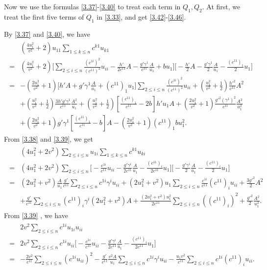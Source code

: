 \documentclass[11pt]{amsart}
\numberwithin{equation}{section}
\begin{document}
Now we use the formulas \eqref{3.37}-\eqref{3.40}  to treat  each term in $Q_1, Q_2$.  At first, we treat  the first five terms of $Q_1$ in \eqref{3.33}, and get \eqref{3.42}-\eqref{3.46}.

By \eqref{3.37} and  \eqref{3.40}, we have
\begin{align}\label{3.42}
\begin{split}
&(\frac{4 u_1^2}{v^2}+2)u_{11}\sum_{1\leq k\leq n}c^{k1}u_{k1}\\
=&(\frac{4 u_1^2}{v^2}+2)\big[\sum_{2\leq i\leq n}\frac{(c^{1i})^2}{(c^{11})^2}u_{ii}-\frac{h'}{2c^{11}} A-\frac{g'\gamma^1}{c^{11}}\frac{A}{u_1}+bu_1\big]
\big[-\frac{h'}{2} A-\frac{g'\gamma^1}{2}\frac{A}{u_1}-\frac{(c^{11})_1}{2} u_1\big]\\
=&-(\frac{2u_1^2}{v^2}+1)\big[h' A+g'\gamma^1\frac{A}{u_1}+(c^{11})_1 u_1\big]\sum_{2\leq i\leq n}\frac{(c^{1i})^2}{(c^{11})^2}u_{ii}
+(\frac{ u_1^2}{v^2}+\frac{1}{2})\frac{h'^2}{c^{11}} A^2\\&+(\frac{ u_1^2}{v^2}+\frac{1}{2})\frac{3h'g'\gamma^1}{c^{11}}\frac{A^2}{u_1}
+(\frac{ u_1^2}{v^2}+\frac{1}{2})[\frac{(c^{11})_1}{c^{11}}-2b]h'u_1A+(\frac{ 2u_1^2}{v^2}+1)\frac{g'^2(\gamma^1)^2}{c^{11}}\frac{A^2}{u_1^2}\\&
+(\frac{ 2u_1^2}{v^2}+1)g'\gamma^1[\frac{(c^{11})_1}{c^{11}}-b]A-(\frac{ 2u_1^2}{v^2}+1)(c^{11})_1bu_1^2.
\end{split}
\end{align}
 From \eqref{3.38} and \eqref{3.39}, we get
\begin{align}\label{3.43}
\begin{split}
&(4u_1^2+2v^2)\sum_{2\leq i\leq n}u_{1i}\sum_{1\leq k\leq n}c^{k1}u_{ki}\\
=&(4u_1^2+2v^2)\sum_{2\leq i\leq n}\big[-\frac{c^{1i}}{c^{11}}u_{ii}-\frac{g'\gamma^i}{2c^{11}}\frac{A}{u_1}-\frac{(c^{11})_i}{2c^{11}} u_1\big]
\big[-\frac{g'\gamma^i}{2}\frac{A}{u_1}-\frac{(c^{11})_i}{2} u_1\big]\\
=&(2u_1^2+v^2)\frac{A}{u_1}\frac{g'}{c^{11}}\sum_{2\leq i\leq n}c^{1i}\gamma^iu_{ii}+(2u_1^2+v^2)u_1\sum_{2\leq i\leq n}\frac{c^{1i}}{c^{11}}(c^{11})_i u_{ii}+\frac{3g'^2}{2}A^2\\
&+\frac{g'}{c^{11}}\sum_{2\leq i\leq n}(c^{11})_i\gamma^i(2u_1^2+v^2)A+\frac{(2u_1^2+v^2)u_1^2}{2c^{11}}\sum_{2\leq i\leq n}((c^{11})_i)^2+\frac{g'^2}{2}\frac{A^2}{u_1^2}.
\end{split}
\end{align}
From \eqref{3.39} , we have
\begin{align}\label{3.44}
\begin{split}
&2v^2\sum_{2\leq i\leq n}c^{1i}u_{1i}u_{ii}\\
=&2v^2\sum_{2\leq i\leq n}c^{1i}u_{ii}\big[-\frac{c^{1i}}{c^{11}}u_{ii}-\frac{g'\gamma^i}{2c^{11}}\frac{A}{u_1}-\frac{(c^{11})_i}{2c^{11}} u_1\big]\\
=&-\frac{2v^2}{c^{11}}\sum_{2\leq i\leq n}(c^{1i}u_{ii})^2-\frac{g'}{c^{11}}\frac{v^2A}{u_1}\sum_{2\leq i\leq n}c^{1i}\gamma^iu_{ii}-\frac{u_1v^2}{c^{11}}\sum_{2\leq i\leq n}c^{1i}(c^{11})_iu_{ii}.
\end{split}
\end{align}
\end{document}
